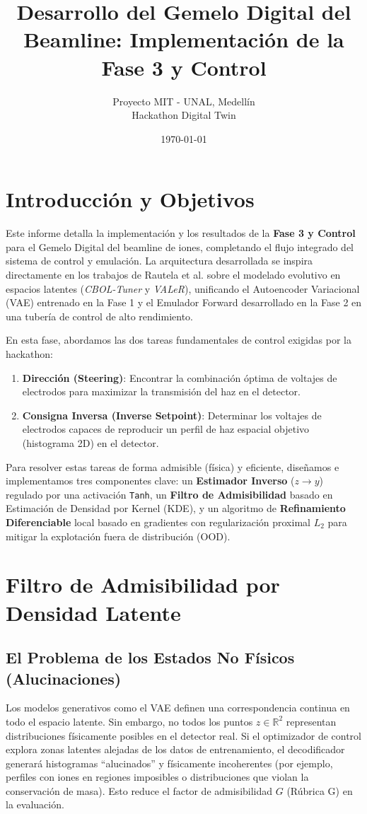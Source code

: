\documentclass[12pt,letterpaper]{article}
\title{\textbf{Desarrollo del Gemelo Digital del Beamline: Implementación de la Fase 3 y Control}}
\author{Proyecto MIT - UNAL, Medellín \\ Hackathon Digital Twin}
\date{\today}
\begin{document}
\maketitle

\tableofcontents
\newpage

\section{Introducción y Objetivos}
Este informe detalla la implementación y los resultados de la \textbf{Fase 3 y Control} para el Gemelo Digital del beamline de iones, completando el flujo integrado del sistema de control y emulación. La arquitectura desarrollada se inspira directamente en los trabajos de Rautela et al. sobre el modelado evolutivo en espacios latentes (\textit{CBOL-Tuner} y \textit{VALeR}), unificando el Autoencoder Variacional (VAE) entrenado en la Fase 1 y el Emulador Forward desarrollado en la Fase 2 en una tubería de control de alto rendimiento.

En esta fase, abordamos las dos tareas fundamentales de control exigidas por la hackathon:
\begin{enumerate}
    \item \textbf{Dirección (Steering)}: Encontrar la combinación óptima de voltajes de electrodos para maximizar la transmisión del haz en el detector.
    \item \textbf{Consigna Inversa (Inverse Setpoint)}: Determinar los voltajes de electrodos capaces de reproducir un perfil de haz espacial objetivo (histograma 2D) en el detector.
\end{enumerate}

Para resolver estas tareas de forma admisible (física) y eficiente, diseñamos e implementamos tres componentes clave: un \textbf{Estimador Inverso} ($z \rightarrow y$) regulado por una activación \texttt{Tanh}, un \textbf{Filtro de Admisibilidad} basado en Estimación de Densidad por Kernel (KDE), y un algoritmo de \textbf{Refinamiento Diferenciable} local basado en gradientes con regularización proximal $L_2$ para mitigar la explotación fuera de distribución (OOD).

\section{Filtro de Admisibilidad por Densidad Latente}
\label{sec:kde}
\subsection{El Problema de los Estados No Físicos (Alucinaciones)}
Los modelos generativos como el VAE definen una correspondencia continua en todo el espacio latente. Sin embargo, no todos los puntos $z \in \mathbb{R}^2$ representan distribuciones físicamente posibles en el detector real. Si el optimizador de control explora zonas latentes alejadas de los datos de entrenamiento, el decodificador generará histogramas ``alucinados'' y físicamente incoherentes (por ejemplo, perfiles con iones en regiones imposibles o distribuciones que violan la conservación de masa). Esto reduce el factor de admisibilidad $G$ (Rúbrica G) en la evaluación.
\end{document}
